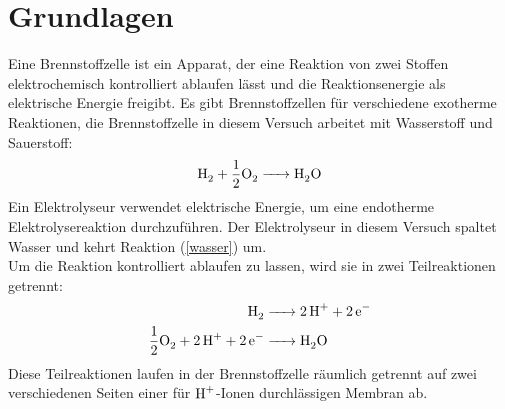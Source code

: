 \documentclass[a4paper,12pt,bibtotocnumbered]{scrartcl}
\numberwithin{equation}{section} %
\begin{document}
\section{Grundlagen}
Eine Brennstoffzelle ist ein Apparat, der eine Reaktion von zwei Stoffen elektrochemisch kontrolliert ablaufen lässt und die Reaktionsenergie als elektrische Energie freigibt. Es gibt Brennstoffzellen für verschiedene exotherme Reaktionen, die Brennstoffzelle in diesem Versuch arbeitet mit Wasserstoff und Sauerstoff:
\begin{equation}\label{wasser}
\ce{H_2 + \frac{1}{2}O_2 -> H_2O}
\end{equation}
Ein Elektrolyseur verwendet elektrische Energie, um eine endotherme Elektrolysereaktion durchzuführen. Der Elektrolyseur in diesem Versuch spaltet Wasser und kehrt Reaktion (\ref{wasser}) um.\\
Um die Reaktion kontrolliert ablaufen zu lassen, wird sie in zwei Teilreaktionen getrennt:
\begin{align}
\ce{H_2 &-> 2H+ + 2e-} \\
\ce{\frac{1}{2}O_2 + 2H+ + 2e- &->H_2O}
\end{align}
Diese Teilreaktionen laufen in der Brennstoffzelle räumlich getrennt auf zwei verschiedenen Seiten einer für $\ce{H^+}$-Ionen durchlässigen Membran ab. 
\end{document}
